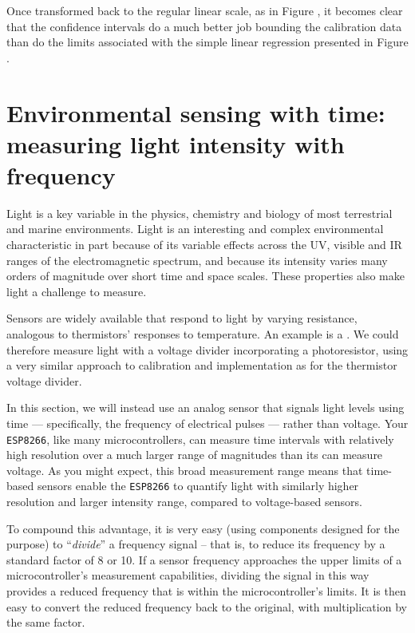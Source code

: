 Once transformed back to the regular linear scale, as in Figure , it becomes clear that the confidence intervals do a much better job bounding the calibration data than do the limits associated with the simple linear regression presented in Figure .







\newpage


\section{Environmental sensing with time: measuring light intensity with frequency}
Light is a key variable in the physics, chemistry and biology of most terrestrial and marine environments.
Light is an interesting and complex environmental characteristic in part because of its variable effects across the UV, visible and IR ranges of the electromagnetic spectrum, and because its intensity varies many orders of magnitude over short time and space scales.
These properties also make light a challenge to measure.

Sensors are widely available that respond to light by varying resistance, analogous to thermistors' responses to temperature.
An example is a .
We could therefore measure light with a voltage divider incorporating a photoresistor, using a very similar approach to calibration and implementation as for the thermistor voltage divider.

In this section, we will instead use an analog sensor that signals light levels using time --- specifically, the frequency of electrical pulses --- rather than voltage.
Your \texttt{ESP8266}, like many microcontrollers, can measure time intervals with relatively high resolution over a much larger range of magnitudes than its \adc can measure voltage.
As you might expect, this broad measurement range means that time-based sensors enable the \texttt{ESP8266} to quantify light with similarly higher resolution and larger intensity range, compared to voltage-based sensors.

To compound this advantage, it is very easy (using components designed for the purpose) to ``\emph{divide}'' a frequency signal -- that is, to reduce its frequency by a standard factor of 8 or 10.
If a sensor frequency approaches the upper limits of a microcontroller's measurement capabilities, dividing the signal in this way provides a reduced frequency that is within the microcontroller's limits.
It is then easy to convert the reduced frequency back to the original, with multiplication by the same factor.

